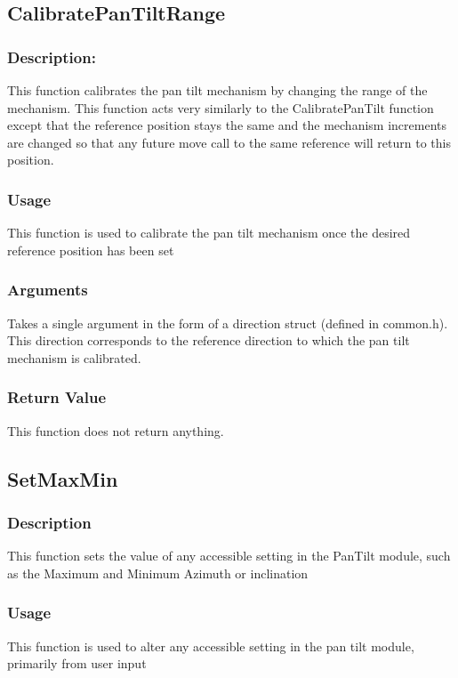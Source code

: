 \documentclass[]{report}
\begin{document}
\subsection{CalibratePanTiltRange}
\subsubsection{Description:}
This function calibrates the pan tilt mechanism by changing the range of the mechanism. This function acts very similarly to the CalibratePanTilt function except that the reference position stays the same and the mechanism increments are changed so that any future move call to the same reference will return to this position.

\subsubsection{Usage}
This function is used to calibrate the pan tilt mechanism once the desired reference position has been set

\subsubsection{Arguments}
Takes a single argument in the form of a direction struct (defined in common.h). This direction corresponds to the reference direction to which the pan tilt mechanism is calibrated.

\subsubsection{Return Value}
This function does not return anything.

\subsection{SetMaxMin}
\subsubsection{Description}
This function sets the value of any accessible setting in the PanTilt module, such as the Maximum and Minimum Azimuth or inclination

\subsubsection{Usage}
This function is used to alter any accessible setting in the pan tilt module, primarily from user input
\end{document}
